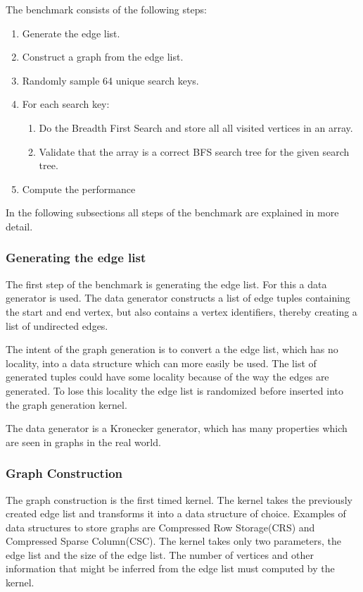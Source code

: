 The benchmark consists of the following steps:
\begin{enumerate}
	\item Generate the edge list.
	\item Construct a graph from the edge list.
	\item Randomly sample 64 unique search keys.
	\item For each search key:
	\begin{enumerate}
		\item Do the Breadth First Search and store all all visited vertices in an array.
		\item Validate that the array is a correct BFS search tree for the given search tree.
	\end{enumerate}
	\item Compute the performance
\end{enumerate}

In the following subsections all steps of the benchmark are explained in more detail.

\subsubsection{Generating the edge list}
The first step of the benchmark is generating the edge list. For this a data generator is used. The data generator constructs a list of edge tuples containing the start and end vertex, but also contains a vertex identifiers, thereby creating a list of undirected edges.

The intent of the graph generation is to convert a the edge list, which has no locality, into a data structure which can more easily be used. The list of generated tuples could have some locality because of the way the edges are generated. To lose this locality the edge list is randomized before inserted into the graph generation kernel. 

The data generator is a Kronecker generator, which has many properties which are seen in graphs in the real world\cite{leskovec2010kronecker}.

\subsubsection{Graph Construction}
The graph construction is the first timed kernel. The kernel takes the previously created edge list and transforms it into a data structure of choice. Examples of data structures to store graphs are Compressed Row Storage(CRS) and Compressed Sparse Column(CSC)\cite{ccs,crs}. The kernel takes only two parameters, the edge list and the size of the edge list. The number of vertices and other information that might be inferred from the edge list must computed by the kernel. 

